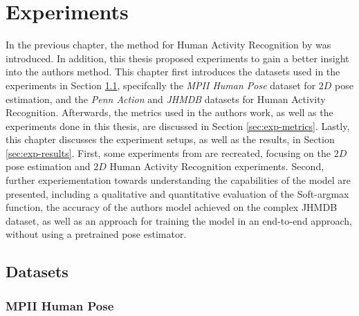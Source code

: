 \chapter{Experiments}
\label{sec:chapter5}
In the previous chapter, the method for Human Activity Recognition by \cite{luvizon_2d/3d_2018} was introduced.
In addition, this thesis proposed experiments to gain a better insight into the authors method.
This chapter first introduces the datasets used in the experiments in Section \ref{sec:exp-datasets}, specifcally the \textit{MPII Human Pose} dataset for $2D$ pose estimation, and the \textit{Penn Action} and \textit{JHMDB} datasets for Human Activity Recognition.
Afterwards, the metrics used in the authors work, as well as the experiments done in this thesis, are discussed in Section \ref{sec:exp-metrics}.
Lastly, this chapter discusses the experiment setups, as well as the results, in Section \ref{sec:exp-results}.
First, some experiments from \cite{luvizon_2d/3d_2018} are recreated, focusing on the $2D$ pose estimation and $2D$ Human Activity Recognition experiments.
Second, further experiementation towards understanding the capabilities of the model are presented, including a qualitative and quantitative evaluation of the Soft-argmax function, the accuracy of the authors model achieved on the complex JHMDB dataset, as well as an approach for training the model in an end-to-end approach, without using a pretrained pose estimator.

\section{Datasets}
\label{sec:exp-datasets}

\subsection{MPII Human Pose}
\label{sec:exp-mpii}

